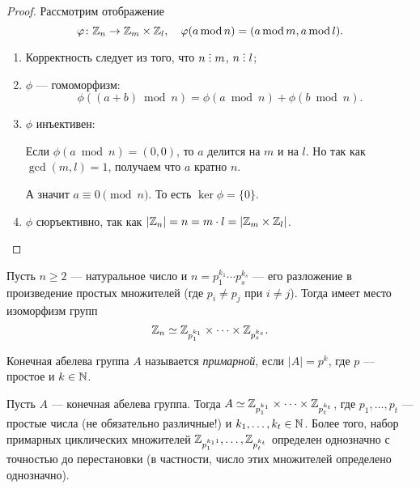 \begin{proof}
    Рассмотрим отображение
    \begin{equation*}
        \varphi \colon \mathbb{Z}_n \to \mathbb{Z}_m \times \mathbb{Z}_l, \quad \varphi(a \mathop{\mathrm{mod}} {n}) = (a \mathop{\mathrm{mod}} m, a \mathop{\mathrm{mod}} l)
    .\end{equation*}

    \begin{enumerate}
    \item Корректность следует из того, что $n \divby m$, $n \divby l$;
    \item $\phi$ --- гомоморфизм:
        \begin{equation*}
            \phi((a + b) \bmod n) = \phi(a \bmod n) + \phi(b \bmod n)
        .\end{equation*}
    \item
        $\phi$ инъективен:

        Если $\phi(a \bmod n) = (0, 0)$, то $a$ делится на $m$ и на $l$.
        Но так как $\gcd(m, l) = 1$, получаем что $a$ кратно $n$.

        А значит $a \equiv 0 \pmod n$.
        То есть $\ker \phi = \{0\}$.

    \item $\phi$ сюръективно, так как $|\mathbb{Z}_n| = n = m \cdot l = |\mathbb{Z}_m \times \mathbb{Z}_l|$.
        \qedhere
    \end{enumerate}
\end{proof}

\begin{corollary}
    Пусть $n \geq 2$ --- натуральное число и $n = p_1^{k_1} \cdots p_s^{k_s}$ --- его разложение в произведение простых множителей (где $p_i \neq p_j$ при $i \neq j$). Тогда имеет место изоморфизм групп
    \begin{equation*}
        \mathbb{Z}_n \simeq \mathbb{Z}_{p_1^{k_1}} \times \dots \times \mathbb{Z}_{p_s^{k_s}} 
    .\end{equation*}
\end{corollary}

\begin{definition}
    Конечная абелева группа $A$ называется \textit{примарной}, если $\left|A\right| = p^{k}$, где $p$ --- простое и $k \in \mathbb{N}$.
\end{definition}

\begin{theorem}
    Пусть $A$ --- конечная абелева группа. Тогда $A \simeq \mathbb{Z}_{p_1^{k_1}} \times \dots \times \mathbb{Z}_{p_t^{k_t}}$, где $p_1, \dots, p_t$ --- простые числа (не обязательно различные!) и $k_1, \dots, k_t \in \mathbb{N}$. Более того, набор примарных циклических множителей $\mathbb{Z}_{p_1^{k_11}}, \dots, \mathbb{Z}_{p_t^{k_t}}$ определен однозначно с точностью до перестановки (в частности, число этих множителей определено однозначно). 
\end{theorem}
